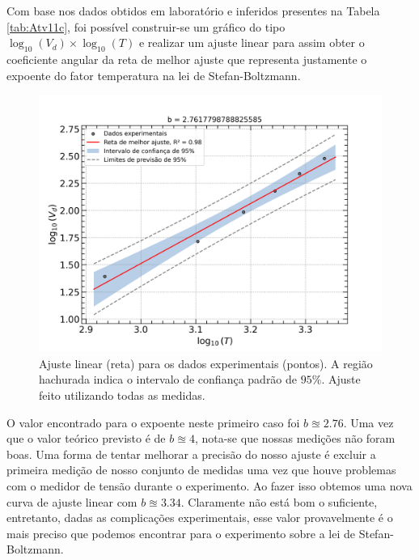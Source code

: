 \documentclass[12pt,a4paper]{article}
\begin{document}
\begin{enumerate}
    Com base nos dados obtidos em laboratório e inferidos presentes na Tabela \ref{tab:Atv11c}, foi possível construir-se um gráfico do tipo $\log_{10}{(V_d)}\times\log_{10}{(T)}$ e realizar um ajuste linear para assim obter o coeficiente angular da reta de melhor ajuste que representa justamente o expoente do fator temperatura na lei de Stefan-Boltzmann.
    \begin{figure}[htp!]
            \centering
            \includegraphics[width=1.00\linewidth]{Figures/Fit_logVdxlogT.png}
            \caption{Ajuste linear (reta) para os dados experimentais (pontos). A região hachurada indica o intervalo de confiança padrão de $95\%$. Ajuste feito utilizando todas as medidas.}
            \label{fig:Fit_logVdxlogT}
    \end{figure}

    O valor encontrado para o expoente neste primeiro caso foi $b\approxeq2.76$. Uma vez que o valor teórico previsto é de $b\approxeq4$, nota-se que nossas medições não foram boas. Uma forma de tentar melhorar a precisão do nosso ajuste é excluir a primeira medição de nosso conjunto de medidas uma vez que houve problemas com o medidor de tensão durante o experimento. Ao fazer isso obtemos uma nova curva de ajuste linear com $b\approxeq3.34$. Claramente não está bom o suficiente, entretanto, dadas as complicações experimentais, esse valor provavelmente é o mais preciso que podemos encontrar para o experimento sobre a lei de Stefan-Boltzmann.


\end{enumerate}
\end{document}
